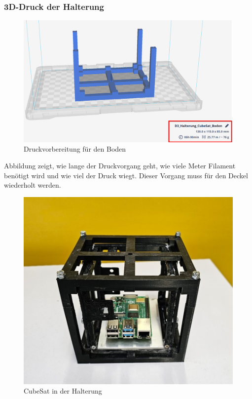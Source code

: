 \subsubsection{3D-Druck der Halterung}
\begin{figure}[H]
    \centering
    \includegraphics[scale=0.7]{image/druckvorbereitungboden.png}
    \caption{Druckvorbereitung für den Boden}
    \label{fig:enter-label}
\end{figure}
\vspace{3mm}
Abbildung zeigt, wie lange der Druckvorgang geht, wie viele Meter Filament benötigt wird und wie viel der Druck wiegt. Dieser Vorgang muss für den Deckel wiederholt werden.\\
\vspace{3mm}
\begin{figure}[H]
    \centering
    \includegraphics[scale=0.7]{image/cubeinhalterung.jpg}
    \caption{CubeSat in der Halterung}
    \label{fig:enter-label}
\end{figure}
